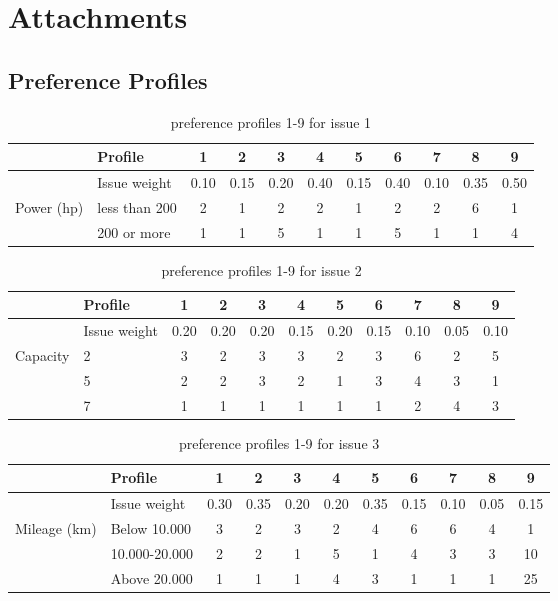 \section{Attachments}

\subsection{Preference Profiles}
\label{sec:attached_preference_profiles}

\begin{table}[H]
\centering
\caption{preference profiles 1-9 for issue 1}
\label{tab:issue1}
\begin{tabular}{|p{3cm}|p{3cm}||c|c|c||c|c|c||c|c|c|}
\hline
&Profile & 1 & 2 & 3 & 4 & 5 & 6 & 7 & 8 & 9 \\
\hline
&Issue weight& 0.10 & 0.15 & 0.20 & 0.40 & 0.15 & 0.40 & 0.10 & 0.35 & 0.50 \\
\hline
\hline
Power (hp)&less than 200 & 2 & 1 &2 &2 &1 &2 &2 &6 &1 \\
&200 or more   & 1 & 1 &5 &1 &1 &5 &1 &1 &4 \\
\hline
\end{tabular}
\end{table}




\begin{table}[H]
\centering
\caption{preference profiles 1-9 for issue 2}
\label{tab:issue2}
\begin{tabular}{|p{3cm}|p{3cm}||c|c|c||c|c|c||c|c|c|}
\hline
&Profile & 1 & 2 & 3 & 4 & 5 & 6 & 7 & 8 & 9 \\
\hline
&Issue weight& 0.20 & 0.20 & 0.20 & 0.15 & 0.20 & 0.15 & 0.10 & 0.05 & 0.10 \\
\hline
\hline
Capacity & 2 & 3 & 2 &3 &3 &2 &3 &6 &2 &5 \\
&5           & 2 & 2 &3 &2 &1 &3 &4 &3 &1 \\
&7           & 1 & 1 &1 &1 &1 &1 &2 &4 &3 \\
\hline
\end{tabular}
\end{table}



\begin{table}[H]
\centering
\caption{preference profiles 1-9 for issue 3}
\label{tab:issue3}
\begin{tabular}{|p{3cm}|p{3cm}||c|c|c||c|c|c||c|c|c|}
\hline
&Profile & 1 & 2 & 3 & 4 & 5 & 6 & 7 & 8 & 9 \\
\hline
&Issue weight& 0.30 & 0.35 & 0.20 & 0.20 & 0.35 & 0.15 & 0.10 & 0.05 & 0.15 \\
\hline
\hline
Mileage (km)
&Below 10.000    & 3 & 2 &3 &2 &4 &6 &6 &4 &1 \\
&10.000-20.000   & 2 & 2 &1 &5 &1 &4 &3 &3 &10 \\
&Above 20.000    & 1 & 1 &1 &4 &3 &1 &1 &1 &25 \\
\hline
\end{tabular}
\end{table}



